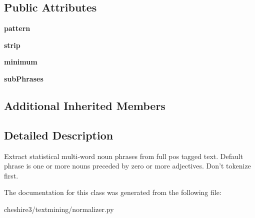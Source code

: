 \subsection*{Public Attributes}
\begin{DoxyCompactItemize}
\item 
\hypertarget{classcheshire3_1_1textmining_1_1normalizer_1_1_pos_phrase_normalizer_aa331d82c38dfac428574c6b4f0b5551e}{{\bfseries pattern}}\label{classcheshire3_1_1textmining_1_1normalizer_1_1_pos_phrase_normalizer_aa331d82c38dfac428574c6b4f0b5551e}

\item 
\hypertarget{classcheshire3_1_1textmining_1_1normalizer_1_1_pos_phrase_normalizer_ab850e8f9564dfd9b613f1920945b0552}{{\bfseries strip}}\label{classcheshire3_1_1textmining_1_1normalizer_1_1_pos_phrase_normalizer_ab850e8f9564dfd9b613f1920945b0552}

\item 
\hypertarget{classcheshire3_1_1textmining_1_1normalizer_1_1_pos_phrase_normalizer_a1c34f0b0936556c01869c1699a86af56}{{\bfseries minimum}}\label{classcheshire3_1_1textmining_1_1normalizer_1_1_pos_phrase_normalizer_a1c34f0b0936556c01869c1699a86af56}

\item 
\hypertarget{classcheshire3_1_1textmining_1_1normalizer_1_1_pos_phrase_normalizer_ada24a326b0007f19c9b7833a1b5ee119}{{\bfseries sub\-Phrases}}\label{classcheshire3_1_1textmining_1_1normalizer_1_1_pos_phrase_normalizer_ada24a326b0007f19c9b7833a1b5ee119}

\end{DoxyCompactItemize}
\subsection*{Additional Inherited Members}


\subsection{Detailed Description}
\begin{DoxyVerb}Extract statistical multi-word noun phrases from full pos tagged text. Default phrase is one or more nouns preceded by zero or more adjectives. Don't tokenize first. \end{DoxyVerb}
 

The documentation for this class was generated from the following file\-:\begin{DoxyCompactItemize}
\item 
cheshire3/textmining/normalizer.\-py\end{DoxyCompactItemize}
